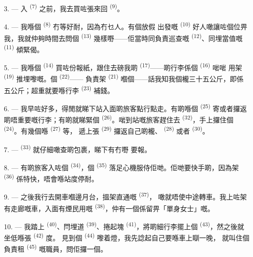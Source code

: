 3. --- 入 \textsuperscript{(7)} 之前，我去買咗張來回
\textsuperscript{(9)}。

4. --- 我喺個 \textsuperscript{(8)} 冇等好耐，因為冇乜人。有個放假
出發嘅 \textsuperscript{(10)} 好人噉讓咗個位畀我，我就仲夠時間去問個
 \textsuperscript{(13)} 幾樣嘢——佢當時同負責巡查嘅
\textsuperscript{(12)}、同埋當值嘅 \textsuperscript{(11)} 傾緊偈。

\VUsaut{3.0mm}

5. --- 我喺個 \textsuperscript{(14)} 買咗份報紙，跟住去磅我啲
 \textsuperscript{(17)}——啲行李係個 \textsuperscript{(16)} 啱啱
用架 \textsuperscript{(19)} 推埋嚟嘅。個 \textsuperscript{(22)}——
負責架 \textsuperscript{(21)} 嗰個——話我知我個櫳三十五公斤，即係
五公斤；超重就要喺行李 \textsuperscript{(23)} 補錢。

6. --- 我早咗好多，得閒就睇下站入面啲旅客點行點走。有啲喺個
 \textsuperscript{(25)} 寄或者攞返啲唔重要嘅行李；有啲就睇緊個
 \textsuperscript{(26)}。啱到站嘅旅客趕住去
\textsuperscript{(32)}，手上攞住個 \textsuperscript{(24)}。有幾個喺 \textsuperscript{(27)} 等，
遞上張 \textsuperscript{(29)} 攞返自己啲櫳、 \textsuperscript{(28)}
或者 \textsuperscript{(30)}。

7. ---  \textsuperscript{(33)} 就仔細噉查啲包裹，睇下有冇嘢
要報。

8. --- 有啲旅客入咗個 \textsuperscript{(34)}，個
\textsuperscript{(35)} 落足心機服侍佢哋。佢哋要快手啲，因為架
\textsuperscript{(36)} 係特快，唔會喺站度停耐。

9. --- 之後我行去開車嗰邊月台，搵架直通嘅 \textsuperscript{(37)}，
噉就唔使中途轉車。我上咗架有走廊嘅車，入面有煙民用嘅
\textsuperscript{(38)}，仲有一個係留畀「單身女士」嘅。

\VUsaut{3.0mm}

10. --- 我踏上 \textsuperscript{(40)}、閂埋道
\textsuperscript{(39)}、捲起塊 \textsuperscript{(41)}，將啲細行李擺上個
 \textsuperscript{(43)}，然之後就坐低喺張 \textsuperscript{(42)} 度。
見到個 \textsuperscript{(44)} 嚟着燈，我先諗起自己要喺車上瞓一晚，
就叫住個負責租 \textsuperscript{(45)} 嘅職員，問佢攞一個。

